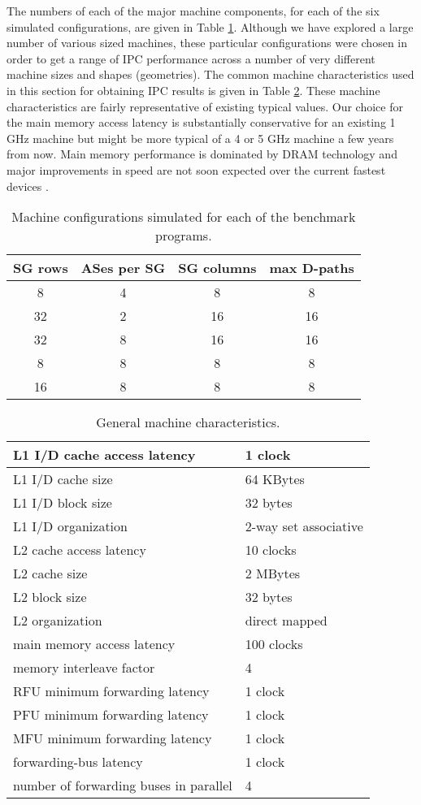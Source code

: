 \documentclass[10pt,dvips]{article}
\begin{document}
The numbers of each of the major machine components, for each of the six
simulated configurations, are given in Table \ref{tab:configs}.
Although we have explored a large number of various sized
machines, these particular configurations were chosen in order
to get a range of IPC performance across a number of very
different machine sizes and shapes (geometries).
The common machine characteristics used in this section for
obtaining IPC results is given in Table \ref{tab:params}.
These machine characteristics are fairly representative of
existing typical values.  Our choice for the main memory
access latency is substantially conservative for an existing
1 GHz machine but might be more typical of a 4 or 5 GHz machine
a few years from now.  Main memory performance is dominated
by DRAM technology and major improvements in speed are not soon
expected over the current fastest devices \cite{Sam99}.
%
\begin{table}
\begin{center}
\caption{Machine configurations simulated for each of the benchmark
programs.}
\label{tab:configs}
\begin{tabular}{|c|c|c|c|}
\hline 
SG rows&
ASes per SG&
SG columns&
max D-paths\\
\hline
\hline 
8&4&8&8\\
\hline 
32&2&16&16\\
\hline 
32&8&16&16\\
\hline 
8&8&8&8\\
\hline 
16&8&8&8\\
\hline
\end{tabular}
\end{center}
\end{table}
%
\begin{table}
\begin{center}
\caption{General machine characteristics.}
\label{tab:params}
\begin{tabular}{|l|l|}
\hline 
L1 I/D cache access latency&1 clock\\
\hline
L1 I/D cache size&64 KBytes\\
\hline
L1 I/D block size&32 bytes\\
\hline
L1 I/D organization&2-way set associative\\
\hline
L2 cache access latency&10 clocks\\
\hline
L2 cache size&2 MBytes\\
\hline
L2 block size&32 bytes\\
\hline
L2 organization&direct mapped\\
\hline
main memory access latency&100 clocks\\
\hline
memory interleave factor&4\\
\hline
RFU minimum forwarding latency&1 clock\\
\hline
PFU minimum forwarding latency&1 clock\\
\hline
MFU minimum forwarding latency&1 clock\\
\hline
forwarding-bus latency&1 clock\\
\hline
number of forwarding buses in parallel&4\\
\hline
\end{tabular}
\end{center}
\end{table}
\end{document}
